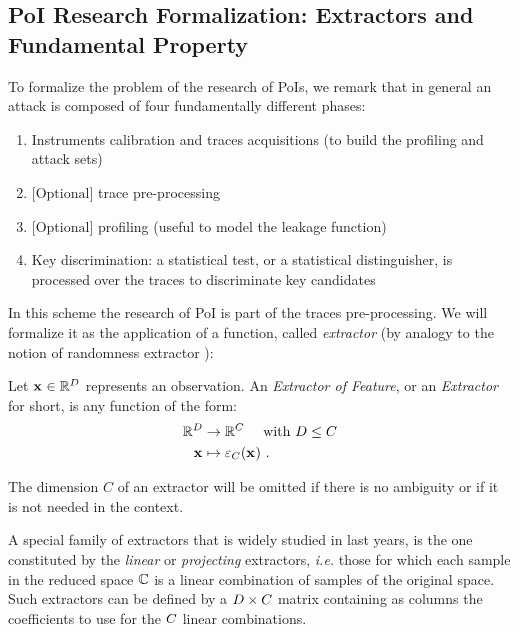 \subsection{PoI Research Formalization: Extractors and Fundamental Property}


To formalize the problem of the research of PoIs, we remark that in general an attack is composed of four fundamentally different phases:

\begin{enumerate}
\item Instruments calibration and traces acquisitions (to build the profiling and attack sets)
\item $\mbox{[Optional]}$ trace pre-processing
\item $\mbox{[Optional]}$  profiling (useful to model the leakage function)
\item Key discrimination: a  statistical test, or a statistical distinguisher, is processed over the  traces to discriminate key candidates
\end{enumerate}
In this scheme the research of PoI is part of the traces pre-processing. We will formalize it as the application of a function, called {\em extractor} (by analogy to the notion of randomness extractor \cite{DBLP:journals/jcss/NisanZ96}):

\begin{definition}
Let $\sss[]{}\in \mathbb{R}^\traceLength$ represents an observation. An {\em Extractor of Feature}, or an {\em Extractor} for short, is any function of the form:
\begin{align*}
\mathbb{R}^\traceLength & \rightarrow \mathbb{R}^\newTraceLength \quad \mbox{ with } \traceLength \leq \newTraceLength \\
\sss[]{} & \mapsto \extractor[\newTraceLength]{\sss[]{}} \mbox{ .}
\end{align*}
\end{definition}
\begin{notation}
The dimension $C$ of an extractor will be omitted if there is no ambiguity or if it is not needed in the context.
\end{notation}

\begin{example}
A special family of extractors that is widely studied in last years, is the one constituted by the {\em linear} or {\em projecting} extractors, \textit{i.e.} those for which each sample in the reduced space $\mathbb{\newTraceLength}$ is a linear combination of samples of the original space. Such extractors can be defined by a $\traceLength \times \newTraceLength$ matrix containing as columns the coefficients to use for the $\newTraceLength$ linear combinations. 
\end{example}

